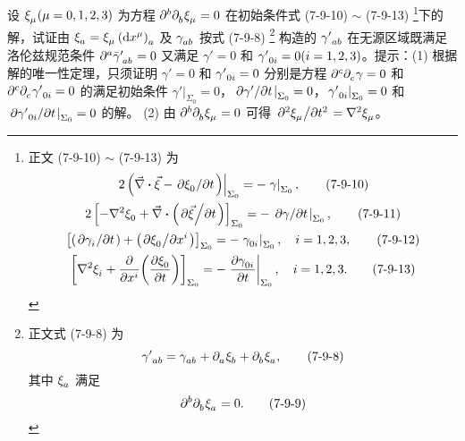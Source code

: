 \begin{xiti}
	\item 设 $\tensor{\xi}{_\mu}(\mu=0,1,2,3)$ 为方程 $\tensor{\partial}{^b} \tensor{\partial}{_b} \tensor{\xi}{_\mu} = 0$ 在初始条件式 (7-9-10) $\sim$ (7-9-13) \footnote{正文 (7-9-10) $\sim$ (7-9-13) 为
	\begin{gather}
		\left. 2 \left( \myvec{\nabla} \vdot \myvec{\xi} - \pdv*{\tensor{\xi}{_0}}{t} \right) \right|_{\Sigma_0} = - \left. \gamma \right|_{\Sigma_0}, \tag{7-9-10}\\
		2 \left[ - \nabla^2 \tensor{\xi}{_0} + \myvec{\nabla} \vdot \left( \pdv*{\myvec{\xi}}{t} \right) \right]_{\Sigma_0} = - \left. \pdv*{\gamma}{t} \right|_{\Sigma_0}, \tag{7-9-11}\\
		\left[ \left( \pdv*{\tensor{\gamma}{_i}}{t} \right) + \left( \pdv*{\tensor{\xi}{_0}}{x^i} \right) \right]_{\Sigma_0} = - \left. \tensor{\gamma}{_0_i} \right|_{\Sigma_0} \qc i = 1,2,3, \tag{7-9-12}\\
		\left[ \nabla^2 \tensor{\xi}{_i} + \pdv{x^i}(\pdv{\tensor{\xi}{_0}}{t}) \right]_{\Sigma_0} = - \left. \pdv{\tensor{\gamma}{_0_i}}{t} \right|_{\Sigma_0} \qc i=1,2,3. \tag{7-9-13}
	\end{gather}}下的解，试证由 $\tensor{\xi}{_a} = \tensor{\xi}{_\mu} \tensor{\left( \dd{x^\mu} \right)}{_a}$ 及 $\tensor{\gamma}{_a_b}$ 按式 (7-9-8) \footnote{正文式 (7-9-8) 为
	\begin{equation}
		\tensor{{\gamma'}}{_a_b} = \tensor{\gamma}{_a_b} + \Partial{a} \tensor{\xi}{_b} + \Partial{b} \tensor{\xi}{_a}, \tag{7-9-8}
	\end{equation}
	其中 $\tensor{\xi}{_a}$ 满足
	\begin{equation}
		\tensor{\partial}{^b} \Partial{b} \tensor{\xi}{_a} = 0. \tag{7-9-9}
	\end{equation}} 构造的 $\tensor{{\gamma'}}{_a_b}$ 在无源区域既满足洛伦兹规范条件 $\tensor{\partial}{^a} \tensor{{{\bar{\gamma}}}}{^\prime_a_b} = 0$ 又满足 $\gamma'=0$ 和 $\tensor{{\gamma'}}{_0_i} = 0(i=1,2,3)$。提示：(1) 根据解的唯一性定理，只须证明 $\gamma'=0$ 和 $\tensor{{\gamma'}}{_0_i}=0$ 分别是方程 $\tensor{\partial}{^c} \tensor{\partial}{_c} \gamma = 0$ 和 $\tensor{\partial}{^c} \tensor{\partial}{_c} \tensor{{\gamma'}}{_0_i} = 0$ 的满足初始条件 $\left. \gamma' \right|_{\Sigma_0} = 0$，$\left. \pdv*{\gamma'}{t} \right|_{\Sigma_0} = 0$，$\left. \tensor{{\gamma'}}{_0_i} \right|_{\Sigma_0} = 0$ 和 $\left. \pdv*{\tensor{{\gamma'}}{_0_i}}{t} \right|_{\Sigma_0} = 0$ 的解。 (2) 由 $\tensor{\partial}{^b} \tensor{\partial}{_b} \tensor{\xi}{_\mu} = 0$ 可得 $\pdv*[2]{\tensor{\xi}{_\mu}}{t} = \nabla^2 \tensor{\xi}{_\mu}$。
	

\end{xiti}
